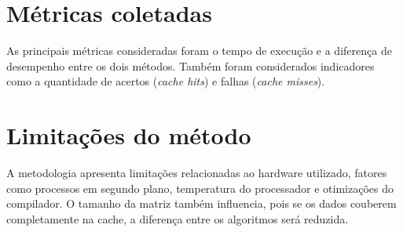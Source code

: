 \section{Métricas coletadas}
As principais métricas consideradas foram o tempo de execução e a diferença de desempenho entre os dois métodos. Também foram considerados indicadores como a quantidade de acertos (\textit{cache hits}) e falhas (\textit{cache misses}).

\section{Limitações do método}
A metodologia apresenta limitações relacionadas ao hardware utilizado, fatores como processos em segundo plano, temperatura do processador e otimizações do compilador. O tamanho da matriz também influencia, pois se os dados couberem completamente na cache, a diferença entre os algoritmos será reduzida.